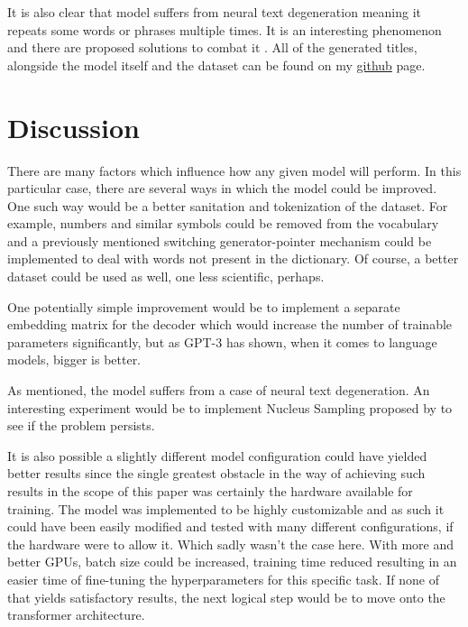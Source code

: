 \documentclass{article}
\begin{document}
It is also clear that model suffers from neural text degeneration meaning it repeats some words or phrases multiple times. It is an interesting phenomenon and there are proposed solutions to combat it \citep{degen}. All of the generated titles, alongside the model itself and the dataset can be found on my \href{https://github.com/dominik-matic/nlp-seq2seq-title-generation}{github} page.

\section{Discussion}

There are many factors which influence how any given model will perform. In this particular case, there are several ways in which the model could be improved. One such way would be a better sanitation and tokenization of the dataset. For example, numbers and similar symbols could be removed from the vocabulary and a previously mentioned switching generator-pointer mechanism \citep{abstractive-text} could be implemented to deal with words not present in the dictionary. Of course, a better dataset could be used as well, one less scientific, perhaps.

One potentially simple improvement would be to implement a separate embedding matrix for the decoder which would increase the number of trainable parameters significantly, but as GPT-3 has shown, when it comes to language models, bigger is better.

As mentioned, the model suffers from a case of neural text degeneration. An interesting experiment would be to implement Nucleus Sampling proposed by \cite{degen} to see if the problem persists. 

It is also possible a slightly different model configuration could have yielded better results since the single greatest obstacle in the way of achieving such results in the scope of this paper was certainly the hardware available for training. 
The model was implemented to be highly customizable and as such it could have been easily modified and tested with many different configurations, if the hardware were to allow it. Which sadly wasn't the case here. With more and better GPUs, batch size could be increased, training time reduced resulting in an easier time of fine-tuning the hyperparameters for this specific task. If none of that yields satisfactory results, the next logical step would be to move onto the transformer architecture.





\end{document}
